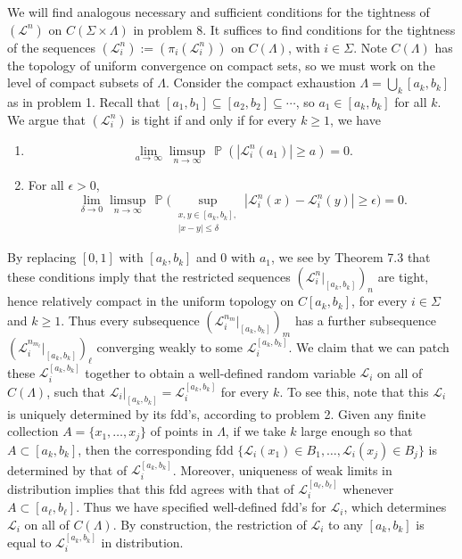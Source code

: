 \documentclass[12pt]{article}
\DeclareMathOperator{\pr}{\mathbb{P}}
\begin{document}
		We will find analogous necessary and sufficient conditions for the tightness of $(\mathcal{L}^n)$ on $C(\Sigma\times\Lambda)$ in problem 8. It suffices to find conditions for the tightness of the sequences $(\mathcal{L}^n_i) := (\pi_i(\mathcal{L}^n_i))$ on $C(\Lambda)$, with $i\in\Sigma$. Note $C(\Lambda)$ has the topology of uniform convergence on compact sets, so we must work on the level of compact subsets of $\Lambda$. Consider the compact exhaustion $\Lambda = \bigcup_k [a_k,b_k]$ as in problem 1. Recall that $[a_1,b_1]\subseteq [a_2,b_2]\subseteq\cdots$, so $a_1\in [a_k,b_k]$ for all $k$. We argue that $(\mathcal{L}^n_i)$ is tight if and only if for every $k\geq 1$, we have
		\begin{enumerate}[label=(\roman*)]
			
			\item 
			\[
			\lim_{a\to\infty} \limsup_{n\to\infty}\, \pr(|\mathcal{L}^n_i(a_1)|\geq a) = 0.
			\]
			
			\item For all $\epsilon>0$,
			\[
			\lim_{\delta\to 0} \limsup_{n\to\infty}\, \pr\bigg(\sup_{\substack{x,y\in [a_k,b_k], \\ |x-y|\leq\delta}} |\mathcal{L}^n_i(x) - \mathcal{L}^n_i(y)| \geq \epsilon\bigg) = 0.
			\]
			
		\end{enumerate}
	
		By replacing $[0,1]$ with $[a_k,b_k]$ and 0 with $a_1$, we see by Theorem 7.3 that these conditions imply that the restricted sequences $(\mathcal{L}^n_i|_{[a_k,b_k]})_n$ are tight, hence relatively compact in the uniform topology on $C[a_k,b_k]$, for every $i\in\Sigma$ and $k\geq 1$. Thus every subsequence $(\mathcal{L}^{n_m}_i|_{[a_k,b_k]})_m$ has a further subsequence $(\mathcal{L}^{n_{m_\ell}}_i|_{[a_k,b_k]})_\ell$ converging weakly to some $\mathcal{L}_i^{[a_k,b_k]}$. We claim that we can patch these $\mathcal{L}_i^{[a_k,b_k]}$ together to obtain a well-defined random variable $\mathcal{L}_i$ on all of $C(\Lambda)$, such that $\mathcal{L}_i|_{[a_k,b_k]} = \mathcal{L}_i^{[a_k,b_k]}$ for every $k$. To see this, note that this $\mathcal{L}_i$ is uniquely determined by its fdd's, according to problem 2. Given any finite collection $A=\{x_1,\dots,x_j\}$ of points in $\Lambda$, if we take $k$ large enough so that $A \subset [a_k,b_k]$, then the corresponding fdd $\{\mathcal{L}_i(x_1)\in B_1, \dots, \mathcal{L}_i(x_j) \in B_j\}$ is determined by that of $\mathcal{L}_i^{[a_k,b_k]}$. Moreover, uniqueness of weak limits in distribution implies that this fdd agrees with that of $\mathcal{L}_i^{[a_\ell,b_\ell]}$ whenever $A\subset[a_\ell,b_\ell]$. Thus we have specified well-defined fdd's for $\mathcal{L}_i$, which determines $\mathcal{L}_i$ on all of $C(\Lambda)$. By construction, the restriction of $\mathcal{L}_i$ to any $[a_k,b_k]$ is equal to $\mathcal{L}_i^{[a_k,b_k]}$ in distribution.
		
\end{document}
